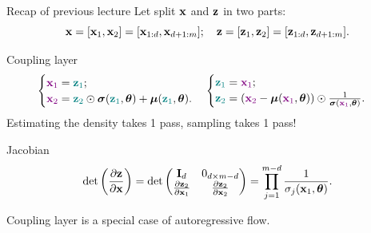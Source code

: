

\begin{frame}
\titlepage
\end{frame}
\begin{frame}{Recap of previous lecture}
	Let split $\mathbf{x}$ and $\mathbf{z}$ in two parts: 
	\[
	\mathbf{x} = [\mathbf{x}_1, \mathbf{x}_2] = [\mathbf{x}_{1:d}, \mathbf{x}_{d+1:m}]; \quad \mathbf{z} = [\mathbf{z}_1, \mathbf{z}_2] = [\mathbf{z}_{1:d}, \mathbf{z}_{d+1:m}].
	\]
	\vspace{-0.5cm}
	\begin{block}{Coupling layer}
		\vspace{-0.5cm}
		\[
		\begin{cases} {\color{violet}\mathbf{x}_1} = {\color{teal}\mathbf{z}_1}; \\ {\color{violet}\mathbf{x}_2} = {\color{teal}\mathbf{z}_2} \odot \boldsymbol{\sigma}({\color{teal}\mathbf{z}_1}, \boldsymbol{\theta}) + \boldsymbol{\mu}({\color{teal}\mathbf{z}_1}, \boldsymbol{\theta}).\end{cases}  
		\begin{cases} {\color{teal}\mathbf{z}_1} ={\color{violet} \mathbf{x}_1}; \\ {\color{teal}\mathbf{z}_2} = \left({\color{violet}\mathbf{x}_2} - \boldsymbol{\mu}({\color{violet}\mathbf{x}_1}, \boldsymbol{\theta}) \right) \odot \frac{1}{\boldsymbol{\sigma}({\color{violet}\mathbf{x}_1}, \boldsymbol{\theta})}.\end{cases}
		\]
		Estimating the density takes 1 pass, sampling takes 1 pass!
	\end{block}
	\begin{block}{Jacobian}
		\vspace{-0.3cm}
		\[
		\det \left( \frac{\partial \mathbf{z}}{\partial \mathbf{x}} \right) = \det 
		\begin{pmatrix}
			\mathbf{I}_d & 0_{d \times m - d} \\
			\frac{\partial \mathbf{z}_2}{\partial \mathbf{x}_1} & \frac{\partial \mathbf{z}_2}{\partial \mathbf{x}_2}
		\end{pmatrix} = \prod_{j=1}^{m - d} \frac{1}{\sigma_j(\mathbf{x}_1, \boldsymbol{\theta})}.
		\]
	\end{block}
	Coupling layer is a special case of autoregressive flow.
	
\end{frame}
